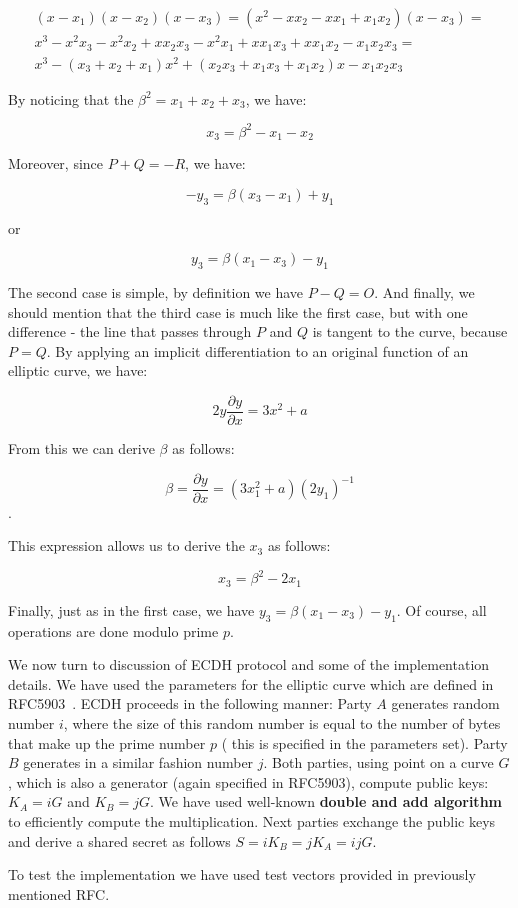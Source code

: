 \begin{multline*}
(x-x_1)(x-x_2)(x-x_3)=(x^2-xx_2-xx_1+x_1x_2)(x-x_3)=\\
x^3-x^2x_3-x^2x_2+xx_2x_3-x^2x_1+xx_1x_3+xx_1x_2-x_1x_2x_3 = \\
x^3-(x_3+x_2+x_1)x^2+(x_2x_3+x_1x_3+x_1x_2)x-x_1x_2x_3
\end{multline*}

By noticing that the $\beta^2=x_1+x_2+x_3$, we have:

$$x_3=\beta^2-x_1-x_2$$

Moreover, since $P+Q=-R$, we have:

$$-y_3=\beta(x_3-x_1) + y_1$$

or

$$y_3=\beta(x_1-x_3) - y_1$$

The second case is simple, by definition we have $P-Q=O$.
And finally, we should mention that the third case is much like 
the first case, but with one difference - the line that passes through
$P$ and $Q$ is tangent to the curve, because $P=Q$. By applying an
implicit differentiation to an original function of an elliptic curve,
we have:

$$2y\frac{\partial y}{\partial x}=3x^2+a$$

From this we can derive $\beta$ as follows:

$$\beta = \frac{\partial y}{\partial x}=(3x_1^2+a)(2y_1)^{-1}$$.

This expression allows us to derive the $x_3$ as follows:

$$x_3=\beta^2-2x_1$$

Finally, just as in the first case, we have 
$y_3=\beta(x_1-x_3) - y_1$. Of course, all 
operations are done modulo prime $p$.

We now turn to discussion of ECDH protocol and some of the implementation
details. We have used the parameters for the elliptic curve which are 
defined in RFC5903~\cite{RFC5903}. ECDH proceeds in the following manner:
Party $A$ generates random number $i$, where the size of this random number 
is equal to the number of bytes that make up the prime number $p$ (
this is specified in the parameters set). Party $B$ generates in 
a similar fashion number $j$. Both parties, using point on a curve $
G$, which is also a generator (again specified in RFC5903), compute public keys:
$K_A = iG$ and $K_B=jG$. We have used well-known {\bf double and add algorithm}~\cite{stinson} 
to efficiently compute the multiplication. Next parties exchange the public keys and
derive a shared secret as follows $S=iK_B=jK_A=ijG$.

To test the implementation we have used test vectors provided in
previously mentioned RFC.

